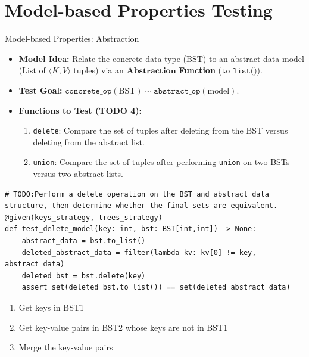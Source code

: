 \documentclass{beamer}
\begin{document}
\section{Model-based Properties Testing}

\begin{frame}{Model-based Properties: Abstraction}
    \begin{itemize}
        \item \textbf{Model Idea:} Relate the concrete data type (BST) to an abstract data model (List of $\langle K, V \rangle$ tuples) via an $\mathbf{Abstraction}$ \textbf{Function} ($\texttt{to\_list()}$).
        \item \textbf{Test Goal:} $\texttt{concrete\_op}(\text{BST}) \sim \texttt{abstract\_op}(\text{model})$.
        \item \textbf{Functions to Test (TODO 4):}
        \begin{enumerate}
            \item \texttt{delete}: Compare the set of tuples after deleting from the BST versus deleting from the abstract list.
            \item \texttt{union}: Compare the set of tuples after performing \texttt{union} on two BSTs versus two abstract lists.
        \end{enumerate}
    \end{itemize}

            \framebreak

    \begin{lstlisting}
# TODO:Perform a delete operation on the BST and abstract data structure, then determine whether the final sets are equivalent.
@given(keys_strategy, trees_strategy)
def test_delete_model(key: int, bst: BST[int,int]) -> None:
    abstract_data = bst.to_list()
    deleted_abstract_data = filter(lambda kv: kv[0] != key, abstract_data)
    deleted_bst = bst.delete(key)
    assert set(deleted_bst.to_list()) == set(deleted_abstract_data)
    \end{lstlisting}

    \framebreak

  \begin{enumerate}
    \item Get keys in BST1
    \item Get key-value pairs in BST2 whose keys are not in BST1
    \item Merge the key-value pairs
  \end{enumerate}


\end{frame}
\end{document}
